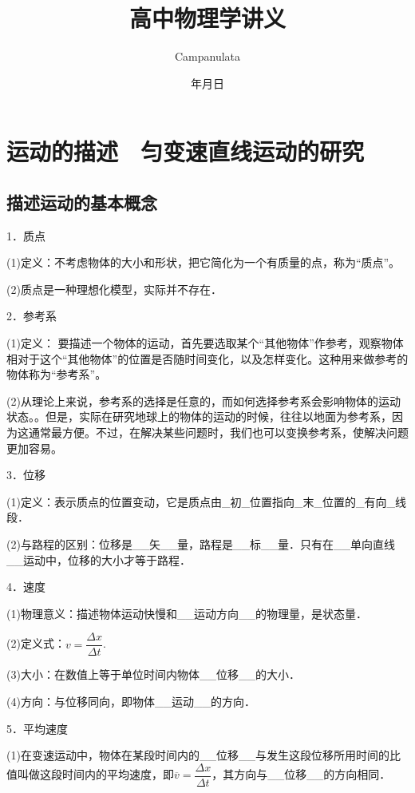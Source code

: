 \documentclass[cn,10.5pt,chinese,mac,chinesefont=founder]{elegantbook}
\title{高中物理学讲义}
\author{Campanulata}
\date{{\the\year}年{\the\month}月{\the\day}日}
\begin{document}
\maketitle
\frontmatter



\tableofcontents

\mainmatter

\chapter{运动的描述　匀变速直线运动的研究}
\section{描述运动的基本概念}





1．质点

(1)定义：不考虑物体的大小和形状，把它简化为一个有质量的点，称为“质点”。

(2)质点是一种理想化模型，实际并不存在．

2．参考系

(1)定义： 要描述一个物体的运动，首先要选取某个“其他物体”作参考，观察物体相对于这个“其他物体”的位置是否随时间变化，以及怎样变化。这种用来做参考的物体称为“参考系”。

(2)从理论上来说，参考系的选择是任意的，而如何选择参考系会影响物体的运动状态。。但是，实际在研究地球上的物体的运动的时候，往往以地面为参考系，因为这通常最方便。不过，在解决某些问题时，我们也可以变换参考系，使解决问题更加容易。

3．位移

(1)定义：表示质点的位置变动，它是质点由\_初\_位置指向\_末\_位置的\_有向\_线段．

(2)与路程的区别：位移是\_\_矢\_\_量，路程是\_\_标\_\_量．只有在\_\_单向直线\_\_运动中，位移的大小才等于路程．

4．速度

(1)物理意义：描述物体运动快慢和\_\_运动方向\_\_的物理量，是状态量．

(2)定义式：$v=\dfrac{\Delta x}{\Delta t}$.

(3)大小：在数值上等于单位时间内物体\_\_位移\_\_的大小．

(4)方向：与位移同向，即物体\_\_运动\_\_的方向．

5．平均速度

(1)在变速运动中，物体在某段时间内的\_\_位移\_\_与发生这段位移所用时间的比值叫做这段时间内的平均速度，即$\overline{v}=\dfrac{\Delta x}{\Delta t}$，其方向与\_\_位移\_\_的方向相同．
\end{document}
